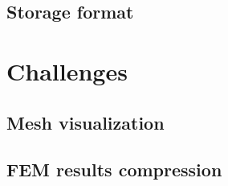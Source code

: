 
\subsection{Storage format} %





\section{Challenges}





\subsection{Mesh visualization}



\subsection{FEM results compression}

